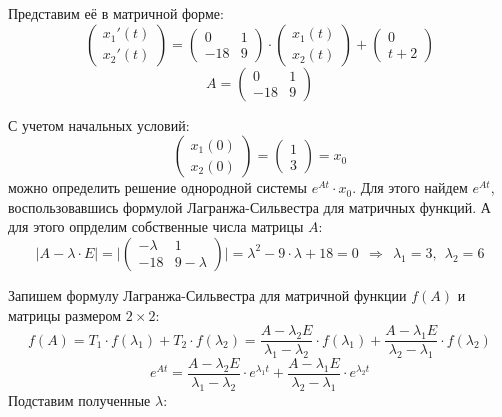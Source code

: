 Представим её в матричной форме:
\begin{displaymath}
\begin{pmatrix}
x_1'(t)
\\
x_2'(t)
\end{pmatrix}
=
\begin{pmatrix}
0  & 1
\\
-18 & 9
\end{pmatrix}
\cdot
\begin{pmatrix}
x_1(t)
\\
x_2(t)
\end{pmatrix}
+
\begin{pmatrix}
0
\\
t + 2
\end{pmatrix}
\end{displaymath}
\begin{displaymath}
A = \begin{pmatrix}
0 & 1
\\
-18 & 9
\end{pmatrix}
\end{displaymath}

С учетом начальных условий:
\begin{displaymath}
\begin{pmatrix}
x_1(0)
\\
x_2(0)
\end{pmatrix}
=
\begin{pmatrix}
1
\\
3
\end{pmatrix}
=
x_0
\end{displaymath}
можно определить решение однородной системы $e^{At} \cdot x_0$. Для этого найдем $e^{At}$, воспользовавшись формулой Лагранжа-Сильвестра для матричных функций. А для этого опрделим собственные числа матрицы $A$:
\begin{displaymath}
\Big | A - \lambda \cdot E \Big | = \Big | \begin{pmatrix}
-\lambda & 1
\\
-18 & 9 - \lambda
\end{pmatrix} \Big | = \lambda^2 - 9 \cdot \lambda + 18 = 0 \ \ \Rightarrow \ \ \lambda_1 = 3,\ \ \lambda_2 = 6
\end{displaymath}

Запишем формулу Лагранжа-Сильвестра для матричной функции $f(A)$ и матрицы размером $2 \times 2$:
\begin{displaymath}
f(A) = T_1 \cdot f(\lambda_1) + T_2 \cdot f(\lambda_2) = \frac{A - \lambda_2 E}{\lambda_1 - \lambda_2} \cdot  f(\lambda_1) + \frac{A - \lambda_1 E}{\lambda_2 - \lambda_1} \cdot f(\lambda_2)
\end{displaymath}
\begin{displaymath}
e^{At} = \frac{A - \lambda_2 E}{\lambda_1 - \lambda_2} \cdot e^{\lambda_1 t} + \frac{A - \lambda_1 E}{\lambda_2 - \lambda_1} \cdot e^{\lambda_2 t}
\end{displaymath}
Подставим полученные $\lambda$:

